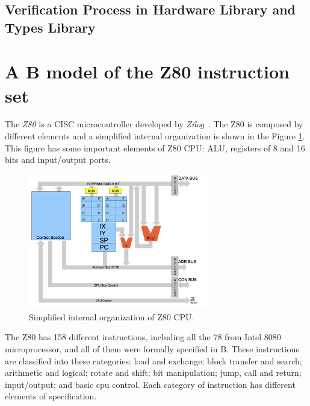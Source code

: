 \documentclass[a4paper]{llncs}
\begin{document}
\subsection{Verification Process in Hardware Library and Types Library} 
\label{sec:VerificationHardwareLibrary}


 





\section{A B model of the Z80 instruction set}
\label{sec:z80}

The \textit{Z80} is a CISC microcontroller developed by
\textit{Zilog}~\cite{Z80_manual}. The Z80 is composed by different elements and a
simplified internal organization is shown in the Figure \ref{fig:DiagramBlock}.
This figure has some important elements of Z80 CPU: ALU, registers of 8 and 16
bits and input/output ports.

\begin{figure}[h] \centering
\includegraphics[width=0.70\textwidth]{images/Architecture.png}
\caption{Simplified internal organization of Z80 CPU.}
\label{fig:DiagramBlock}
\end{figure}


The Z80 has 158 different instructions, including all the 78 from Intel 8080
microprocessor, and all of them were formally specified in B. These instructions are classified
into these categories: load and exchange; block transfer and search; arithmetic
and logical; rotate and shift; bit manipulation; jump, call and return;
input/output; and basic cpu control. Each category of instruction has different
elements of specification.
\end{document}
